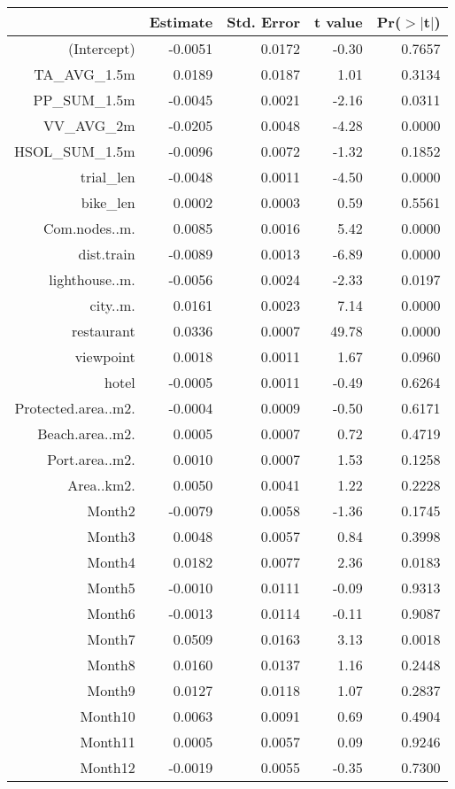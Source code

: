 \begin{table}[ht]
\centering
\begin{tabular}{rrrrr}
  \hline
 & Estimate & Std. Error & t value & Pr($>$$|$t$|$) \\ 
  \hline
(Intercept) & -0.0051 & 0.0172 & -0.30 & 0.7657 \\ 
  TA\_AVG\_1.5m & 0.0189 & 0.0187 & 1.01 & 0.3134 \\ 
  PP\_SUM\_1.5m & -0.0045 & 0.0021 & -2.16 & 0.0311 \\ 
  VV\_AVG\_2m & -0.0205 & 0.0048 & -4.28 & 0.0000 \\ 
  HSOL\_SUM\_1.5m & -0.0096 & 0.0072 & -1.32 & 0.1852 \\ 
  trial\_len & -0.0048 & 0.0011 & -4.50 & 0.0000 \\ 
  bike\_len & 0.0002 & 0.0003 & 0.59 & 0.5561 \\ 
  Com.nodes..m. & 0.0085 & 0.0016 & 5.42 & 0.0000 \\ 
  dist.train & -0.0089 & 0.0013 & -6.89 & 0.0000 \\ 
  lighthouse..m. & -0.0056 & 0.0024 & -2.33 & 0.0197 \\ 
  city..m. & 0.0161 & 0.0023 & 7.14 & 0.0000 \\ 
  restaurant & 0.0336 & 0.0007 & 49.78 & 0.0000 \\ 
  viewpoint & 0.0018 & 0.0011 & 1.67 & 0.0960 \\ 
  hotel & -0.0005 & 0.0011 & -0.49 & 0.6264 \\ 
  Protected.area..m2. & -0.0004 & 0.0009 & -0.50 & 0.6171 \\ 
  Beach.area..m2. & 0.0005 & 0.0007 & 0.72 & 0.4719 \\ 
  Port.area..m2. & 0.0010 & 0.0007 & 1.53 & 0.1258 \\ 
  Area..km2. & 0.0050 & 0.0041 & 1.22 & 0.2228 \\ 
  Month2 & -0.0079 & 0.0058 & -1.36 & 0.1745 \\ 
  Month3 & 0.0048 & 0.0057 & 0.84 & 0.3998 \\ 
  Month4 & 0.0182 & 0.0077 & 2.36 & 0.0183 \\ 
  Month5 & -0.0010 & 0.0111 & -0.09 & 0.9313 \\ 
  Month6 & -0.0013 & 0.0114 & -0.11 & 0.9087 \\ 
  Month7 & 0.0509 & 0.0163 & 3.13 & 0.0018 \\ 
  Month8 & 0.0160 & 0.0137 & 1.16 & 0.2448 \\ 
  Month9 & 0.0127 & 0.0118 & 1.07 & 0.2837 \\ 
  Month10 & 0.0063 & 0.0091 & 0.69 & 0.4904 \\ 
  Month11 & 0.0005 & 0.0057 & 0.09 & 0.9246 \\ 
  Month12 & -0.0019 & 0.0055 & -0.35 & 0.7300 \\ 
   \hline
\end{tabular}
\end{table}
